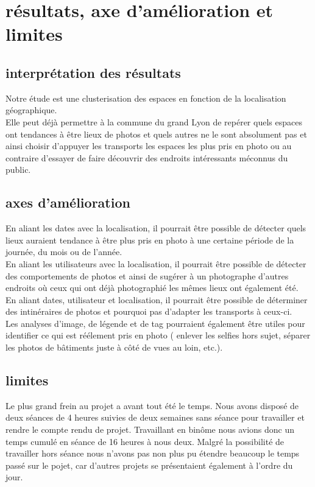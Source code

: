 \chapter{résultats, axe d'amélioration et limites}
\section{interprétation des résultats}

Notre étude est une clusterisation des espaces en fonction de la localisation géographique.
\\

Elle peut déjà permettre à la commune du grand Lyon de repérer quels espaces ont tendances à être lieux de photos et quels autres ne le sont absolument pas et ainsi choisir d'appuyer les transports les espaces les plus pris en photo ou au contraire d'essayer de faire découvrir des endroits intéressants méconnus du public.

\section{axes d'amélioration}

En aliant les dates avec la localisation, il pourrait être possible de détecter quels lieux auraient tendance à être plus pris en photo à une certaine période de la journée, du mois ou de l'année.
\\

En aliant les utilisateurs avec la localisation, il pourrait être possible de détecter des comportements de photos et ainsi de sugérer à un photographe d'autres endroits où ceux qui ont déjà photographié les mêmes lieux ont également été.
\\

En aliant dates, utilisateur et localisation, il pourrait être possible de déterminer des intinéraires de photos et pourquoi pas d'adapter les transports à ceux-ci.
\\

Les analyses d'image, de légende et de tag pourraient également être utiles pour identifier ce qui est réélement pris en photo ( enlever les selfies hors sujet, séparer les photos de bâtiments juste à côté de vues au loin, etc.).

\section{limites}

Le plus grand frein au projet a avant tout été le temps. Nous avons disposé de deux séances de 4 heures suivies de deux semaines sans séance pour travailler et rendre le compte rendu de projet. 
Travaillant en binôme nous avions donc un temps cumulé en séance de 16 heures à nous deux. Malgré la possibilité de travailler hors séance nous n'avons pas non plus pu étendre beaucoup le temps passé sur le pojet, car d'autres projets se présentaient également à l'ordre du jour.
\\

